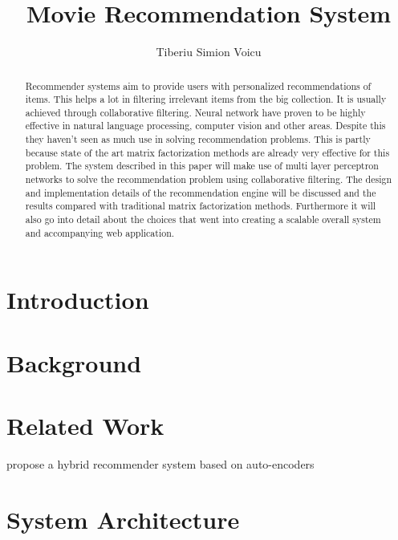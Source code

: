 \documentclass[12pt]{elsarticle}
\begin{document}
\begin{frontmatter}

\title{Movie Recommendation System}

\author{Tiberiu Simion Voicu}

\address{Post graduate thesis project, ECS751P}

\begin{abstract}
    Recommender systems aim to provide users with personalized recommendations of items. This helps a lot in filtering irrelevant items from the big collection. It is usually achieved through collaborative filtering. 
    Neural network have proven to be highly effective in natural language processing, computer vision and other areas. Despite this they haven't seen as much use in solving recommendation problems. This is partly because state of the art matrix factorization methods are already very effective for this problem. The system described in this paper will make use of multi layer perceptron networks to solve the recommendation problem using collaborative filtering. The design and implementation details of the recommendation engine will be discussed and the results compared with traditional matrix factorization methods. Furthermore it will also go into detail about the choices that went into creating a scalable overall system and accompanying web application.
\end{abstract}

\end{frontmatter}

\newpage
\tableofcontents

\section{Introduction}


\section{Background}


\section{Related Work}
\citet{HybridAutoencoders} propose a hybrid recommender system based on auto-encoders

\section{System Architecture}

\end{document}
